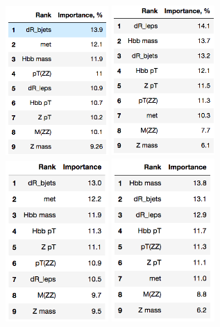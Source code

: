 \begin{figure}[tbp]
  \begin{center}
   \includegraphics[width=0.35\textwidth]{figures/ee_low.png}
   \includegraphics[width=0.35\textwidth]{figures/ee_high.png}\\
   \includegraphics[width=0.35\textwidth]{figures/mm_low.png}
   \includegraphics[width=0.35\textwidth]{figures/mm_high.png}

\end{center}
\end{figure}
